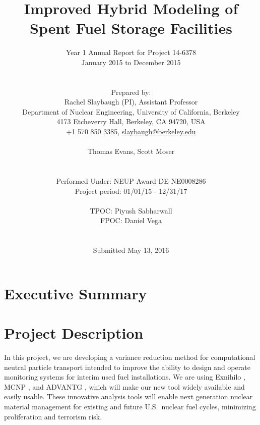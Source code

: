\documentclass[12pt]{article}
\title{Improved Hybrid Modeling of Spent Fuel Storage Facilities}
\author{ 
  Year 1 Annual Report for Project 14-6378\\
  January 2015 to December 2015\\
  \\
  \\
  Prepared by:\\
  Rachel Slaybaugh (PI), Assistant Professor \\
  Department of Nuclear Engineering, University of California, Berkeley \\
  4173 Etcheverry Hall, Berkeley, CA 94720, USA\\
  +1 570 850 3385, 
  \href{mailto:slaybaugh@berkeley.edu}{slaybaugh@berkeley.edu}\\
  \\
  Thomas Evans, Scott Moser\\
  \\
  \\
  Performed Under: NEUP Award DE-NE0008286\\
  Project period: 01/01/15 - 12/31/17 \\
  \\
  TPOC: Piyush Sabharwall\\
  FPOC: Daniel Vega\\
  \\
  \\
  Submitted May 13, 2016
}
\begin{document}


\maketitle
\clearpage
\tableofcontents
\clearpage
%

%
\section*{Executive Summary}
\label{sect::summary}
\clearpage

\section{Project Description}
\label{sect::project}

In this project, we are developing a variance reduction method for computational neutral particle transport intended to improve the ability to design and operate monitoring systems for interim used fuel installations. 
We are using Exnihilo \cite{evans_denovo:_2010}, MCNP \cite{brown_mcnp_2002}, and ADVANTG \cite{mosher_new_2010}, which will make our new tool widely available and easily usable. 
These innovative analysis tools will enable next generation nuclear material management for existing and future U.S.\ nuclear fuel cycles, minimizing proliferation and terrorism risk.
\end{document}
